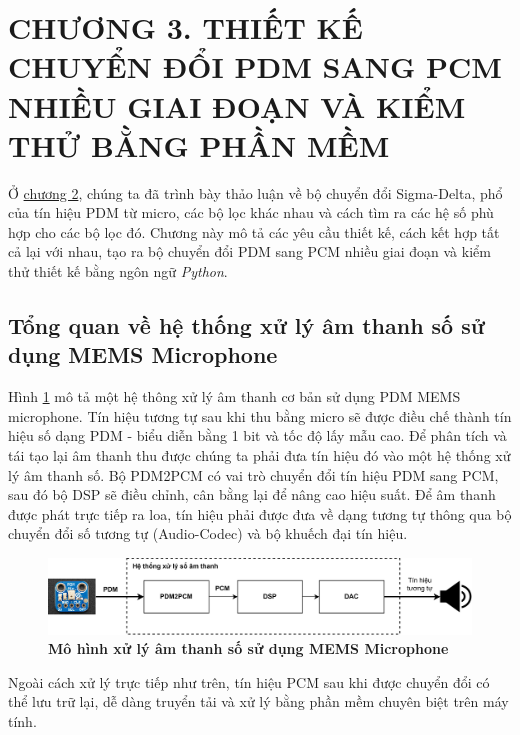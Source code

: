 \section*{CHƯƠNG 3. THIẾT KẾ CHUYỂN ĐỔI PDM SANG PCM NHIỀU GIAI ĐOẠN VÀ KIỂM THỬ BẰNG PHẦN MỀM} \label{chuong3}
\setcounter{section}{3}
\setcounter{subsection}{0}
\setcounter{figure}{0}
\setcounter{table}{0}
Ở \hyperref[chuong2]{chương 2}, chúng ta đã trình bày thảo luận về bộ chuyển đổi Sigma-Delta, phổ của tín hiệu PDM từ micro, các bộ lọc khác nhau và cách tìm ra các hệ số phù hợp cho các bộ lọc đó. Chương này mô tả các yêu cầu thiết kế, cách kết hợp tất cả lại với nhau, tạo ra bộ chuyển đổi PDM sang PCM nhiều giai đoạn và kiểm thử thiết kế bằng ngôn ngữ \textit{Python}.
\subsection{Tổng quan về hệ thống xử lý âm thanh số sử dụng MEMS Microphone}
Hình \ref{audio_top} mô tả một hệ thông xử lý âm thanh cơ bản sử dụng PDM MEMS microphone. Tín hiệu tương tự sau khi thu bằng micro sẽ được điều chế thành tín hiệu số dạng PDM - biểu diễn bằng 1 bit và tốc độ lấy mẫu cao. Để phân tích và tái tạo lại âm thanh thu được chúng ta phải đưa tín hiệu đó vào một hệ thống xử lý âm thanh số. Bộ PDM2PCM có vai trò chuyển đổi tín hiệu PDM sang PCM, sau đó bộ DSP sẽ điều chỉnh, cân bằng lại để nâng cao hiệu suất. Để âm thanh được phát trực tiếp ra loa, tín hiệu phải được đưa về dạng tương tự thông qua bộ chuyển đổi số tương tự (Audio-Codec) và bộ khuếch đại tín hiệu.
\begin{figure}[H]
    \centering
    \includegraphics[width=14cm]{Images/Chuong3/MoDau/audio_top.png}
    \caption[Sơ đồ tổng quát của bộ chuyển đổi]{\bfseries \fontsize{12pt}{0pt}\selectfont Mô hình xử lý âm thanh số sử dụng MEMS Microphone}
    \label{audio_top}
\end{figure}

Ngoài cách xử lý trực tiếp như trên, tín hiệu PCM sau khi được chuyển đổi có thể lưu trữ lại, dễ dàng truyển tải và xử lý bằng phần mềm chuyên biệt trên máy tính.

